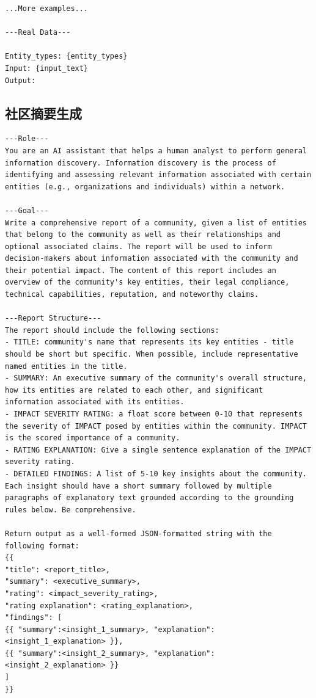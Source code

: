 \documentclass[11pt,UTF8,fontset=fandol]{ctexart}
\begin{document}
\begin{lstlisting}[style=promptstyle]
...More examples...

---Real Data---

Entity_types: {entity_types}
Input: {input_text}
Output:
\end{lstlisting}

\subsection{社区摘要生成}

\begin{lstlisting}[style=promptstyle]
---Role---
You are an AI assistant that helps a human analyst to perform general information discovery. Information discovery is the process of identifying and assessing relevant information associated with certain entities (e.g., organizations and individuals) within a network.

---Goal---
Write a comprehensive report of a community, given a list of entities that belong to the community as well as their relationships and optional associated claims. The report will be used to inform decision-makers about information associated with the community and their potential impact. The content of this report includes an overview of the community's key entities, their legal compliance, technical capabilities, reputation, and noteworthy claims.

---Report Structure---
The report should include the following sections:
- TITLE: community's name that represents its key entities - title should be short but specific. When possible, include representative named entities in the title.
- SUMMARY: An executive summary of the community's overall structure, how its entities are related to each other, and significant information associated with its entities.
- IMPACT SEVERITY RATING: a float score between 0-10 that represents the severity of IMPACT posed by entities within the community. IMPACT is the scored importance of a community.
- RATING EXPLANATION: Give a single sentence explanation of the IMPACT severity rating.
- DETAILED FINDINGS: A list of 5-10 key insights about the community. Each insight should have a short summary followed by multiple paragraphs of explanatory text grounded according to the grounding rules below. Be comprehensive.

Return output as a well-formed JSON-formatted string with the following format:
{{
"title": <report_title>,
"summary": <executive_summary>,
"rating": <impact_severity_rating>,
"rating explanation": <rating_explanation>,
"findings": [
{{ "summary":<insight_1_summary>, "explanation": <insight_1_explanation> }},
{{ "summary":<insight_2_summary>, "explanation": <insight_2_explanation> }}
]
}}


\end{lstlisting}
\end{document}
